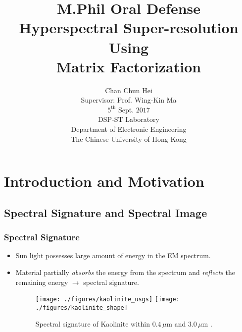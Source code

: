 \documentclass[10pt,mathserif]{beamer}
\title{{\footnotesize M.Phil Oral Defense}\\\large \bfseries Hyperspectral Super-resolution Using\\Matrix Factorization}
\author{Chan Chun Hei\\[6ex]
Supervisor: Prof. Wing-Kin Ma\\[6ex]
$5^\text{th}$ Sept. $2017$\\[3ex]
DSP-ST Laboratory\\
Department of Electronic Engineering\\
The Chinese University of Hong Kong}
\date{}
\begin{document}
\frame{
\thispagestyle{empty}
\titlepage
}

\section{Introduction and Motivation}
\subsection{Spectral Signature and Spectral Image}
    \begin{frame}
        \frametitle{Spectral Signature}
        \begin{itemize}
            \item Sun light possesses large amount of energy in the EM
                  spectrum.
            \item Material partially \textit{absorbs} the energy from the
                  spectrum and \textit{reflects} the remaining energy
                  $\rightarrow$ spectral signature.
            \begin{figure}
                \texttt{[image: ./figures/kaolinite\_usgs]}
                \texttt{[image: ./figures/kaolinite\_shape]}
                \caption{Spectral signature of Kaolinite within $0.4\,\mu$m
                         and $3.0\,\mu$m \cite{USGS}.}
                \label{fig:kaolinite}
            \end{figure}
        \end{itemize}

\end{frame}
\end{document}
